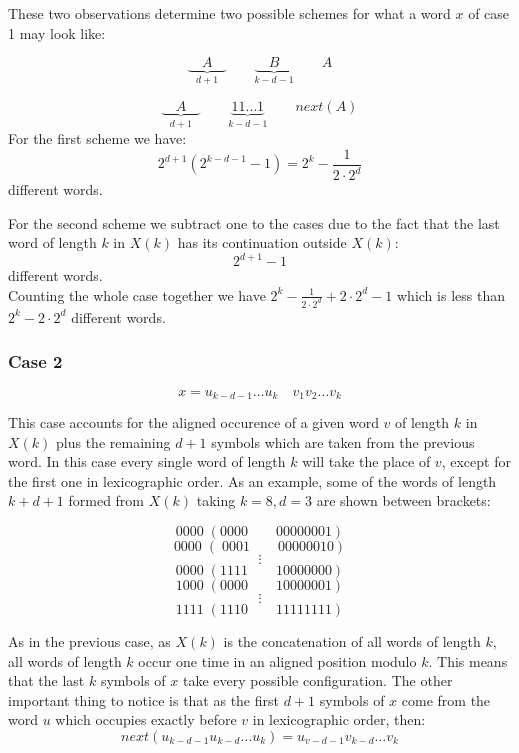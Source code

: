 \documentclass[11pt,a4paper]{tesis}
\newcommand{\note}[1]{\textbf{\color{red}{#1}}}
\begin{document}
These two observations determine two possible schemes for what a word $x$ of case 1 may look like:

$$\underbrace{\quad A \quad }_{d +1} \qquad \underbrace{\quad B \quad }_{k - d - 1}  \qquad A$$


$$\underbrace{\quad A \quad }_{d +1} \qquad \underbrace{ 11 \dots 1  }_{k - d - 1}  \qquad next(A) $$
For the first scheme we have:
$$2^{d + 1}  (2^{k - d - 1} - 1) =  2^k - \frac{1}{2\cdot2^{d} }$$
different words.

For the second scheme we subtract one to the cases due to the fact that the last word of length $k$ in $X(k)$ has its continuation outside $X(k)$:
$$2^{d + 1}   - 1$$
different words.
\\

Counting the whole case together we have $  2^k - \frac{1}{2\cdot2^{d} } + 2\cdot 2^d - 1$ which is less than $2^k -  2\cdot 2^d$ different words.

\subsubsection{Case 2}
$$ x = u_{k-d-1} \dots u_k \quad v_1 v_2 \dots v_k$$

This case accounts for the aligned occurence
of a given word $v$ of length $k$ in $X(k)$ plus the remaining $d + 1$ symbols which are taken from the previous word. In this case every single word of length $k$ will take the place of $v$, except for the first one in lexicographic order.
As an example, some of the words of length $k + d + 1$ formed from $X(k)$ taking $k = 8, d = 3$ are shown between brackets:

$$0000 \; (0000 \qquad 00000001)$$
$$0000 \; ( \; 0001 \qquad 00000010)$$
$$\vdots$$
$$0000 \; (1111 \qquad 10000000)$$
$$1000 \; (0000 \qquad 10000001)$$
$$\vdots$$
$$1111 \; (1110 \qquad 11111111)$$

As in the previous case, as $X(k)$ is the concatenation of all words of length $k$, all words of length $k$ occur one time in an aligned position modulo $k$. This means that the last $k$ symbols of $x$ take every possible configuration.
The other important thing to notice is that as the first $d + 1$ symbols of $x$ come from the word $u$ which occupies exactly before $v$ in lexicographic order, then: 
$$next(u_{k-d-1} u_{k-d} \dots u_k) = u_{v-d-1} v_{k-d} \dots v_k$$
\end{document}
